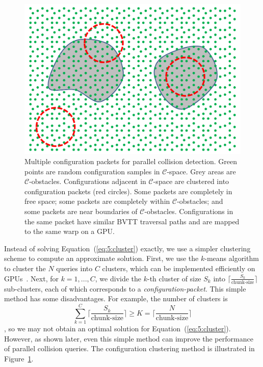 \begin{figure}[!htb]
\centering
\includegraphics[width=\linewidth]{figs/5/collisionpacket.pdf}
\caption[Multiple configuration packet for parallel collision detection]{Multiple configuration packets for parallel collision detection. Green points are random configuration samples in $\mathcal{C}$-space. Grey areas are $\mathcal{C}$-obstacles. Configurations adjacent in $\mathcal{C}$-space are clustered into configuration packets (red circles). Some packets are completely in free space; some packets are completely within $\mathcal{C}$-obstacles; and some packets are near boundaries of $\mathcal{C}$-obstacles. Configurations in the
same packet have similar BVTT traversal paths and are mapped to the same warp on a GPU.}
  \label{fig:5:collisionpacket}
\end{figure}

Instead of solving Equation~(\ref{eq:5:cluster}) exactly, we use a simpler clustering scheme to compute an approximate solution. First, we use the $k$-means algorithm to cluster the $N$ queries into $C$ clusters, which can be implemented efficiently on GPUs~\cite{Che:2008}. Next, for $k = 1, ..., C$, we divide the $k$-th cluster of size $S_k$
into $\lceil \frac{S_k}{\text{chunk-size}}\rceil$ sub-clusters, each of which corresponds to a \emph{configuration-packet}. This simple method has some disadvantages. For example,
the number of clusters is $$\sum_{k=1}^C \lceil \frac{S_k}{\text{chunk-size}}\rceil \geq K = \lceil \frac{N}{\text{chunk-size}} \rceil$$, so we may not obtain an optimal solution for 
Equation~(\ref{eq:5:cluster}). However, as shown later, even this simple method can improve the performance
of parallel collision queries. The configuration clustering method is illustrated in
Figure~\ref{fig:5:collisionpacket}.

